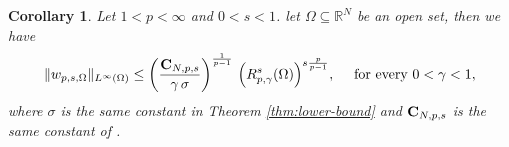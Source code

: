 \documentclass{amsart}
\newtheorem{corollary}[theorem]{Corollary}
\theoremstyle{definition}
\numberwithin{equation}{section}
\begin{document}
	\begin{corollary}
		Let $1 < p < \infty$ and $0 < s < 1$. let $\Omega \subseteq \mathbb{R}^N$ be an open set, then we have 
		\[
		\|w_{p, s, \Omega}\|_{L^\infty(\Omega)} \le \left(\frac{{\bf C}_{N,p,s}}{\gamma\,\sigma}\right)^\frac{1}{p-1}\,\Big(R^s_{p,\gamma}(\Omega) \Big)^{s\frac{p}{p-1}}, \quad \mbox{ for every } 0 < \gamma < 1,
		\]
		where $\sigma$ is the same constant in Theorem \ref{thm:lower-bound} and ${\bf C}_{N,p,s}$ is the same constant of \cite[formula (5.7)]{franzina-torsion}.  
	\end{corollary}	
	
	
\end{document}
